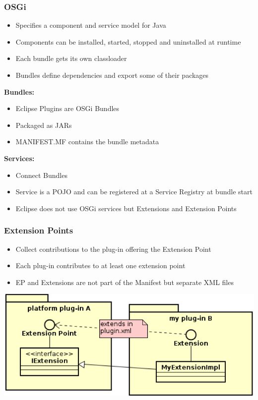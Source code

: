 \subsubsection{OSGi}
\begin{itemize}
    \item Specifies a component and service model for Java
    \item Components can be installed, started, stopped and uninstalled at runtime 
    \item Each bundle gets its own classloader
    \item Bundles define dependencies and export some of their packages
\end{itemize}
\textbf{Bundles:}
\begin{itemize}
    \item Eclipse Plugins are OSGi Bundles
    \item Packaged as JARs
    \item MANIFEST.MF contains the bundle metadata
\end{itemize}
\textbf{Services:}
\begin{itemize}
    \item Connect Bundles
    \item Service is a POJO and can be registered at a Service Registry at bundle start
    \item Eclipse does not use OSGi services but Extensions and Extension Points
\end{itemize}

\subsubsection{Extension Points}
\begin{itemize}
    \item Collect contributions to the plug-in offering the Extension Point 
    \item Each plug-in contributes to at least one extension point
    \item EP and Extensions are not part of the Manifest but separate XML files
\end{itemize}
\includegraphics[width=0.7\linewidth]{./img/ep.png}

